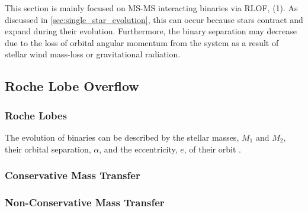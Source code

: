 This section is mainly focused on MS-MS interacting binaries via RLOF, (1). As discussed in \cref{sec:single_star_evolution}, this can occur because stars contract and expand during their evolution. Furthermore, the binary separation may decrease due to the loss of orbital angular momentum from the system as a result of stellar wind mass-loss or gravitational radiation. 

\subsection{Roche Lobe Overflow}

\subsubsection{Roche Lobes}

The evolution of binaries can be described by the stellar masses, $M_1$ and $M_2$, their orbital separation, $\alpha$, and the eccentricity, $e$, of their orbit \citep{postnov2014evolution,sana2012binary,toonen2014popcorn}.

\subsubsection{Conservative Mass Transfer}

\subsubsection{Non-Conservative Mass Transfer}
